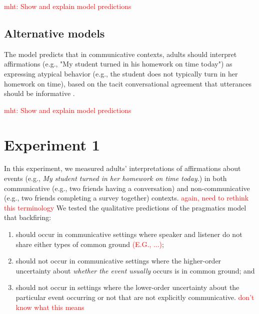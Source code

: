 \documentclass[10pt,letterpaper]{article}
\newcommand{\red}[1]{\textcolor{Red}{#1}}
\begin{document}
\red{mht: Show and explain model predictions}

\subsection{Alternative models}
The model predicts that in communicative contexts, adults should interpret affirmations (e.g., "My student turned in his homework on time today") as expressing atypical behavior (e.g., the student does not typically turn in her homework on time), based on the tacit conversational agreement that utterances should be informative \cite{Grice1975}. 

\red{mht: Show and explain model predictions}






\section{Experiment 1}

In this experiment, we measured adults' interpretations of affirmations about events (e.g., \emph{My student turned in her homework on time today.}) in both communicative (e.g., two friends having a conversation) and non-communicative (e.g., two friends completing a survey together) contexts.  \red{again, need to rethink this terminology}  We tested the qualitative predictions of the pragmatics model that backfiring:
\begin{enumerate}
\item should occur in communicative settings where speaker and listener do not share either types of common ground \red{(E.G., ...)};
\item should not occur in communicative settings where the higher-order uncertainty about \emph{whether the event usually} occurs is in common ground; and 
\item should not occur in settings where the lower-order uncertainty about the particular event occurring or not that are not explicitly communicative. \red{don't know what this means}
\end{enumerate}
\end{document}
